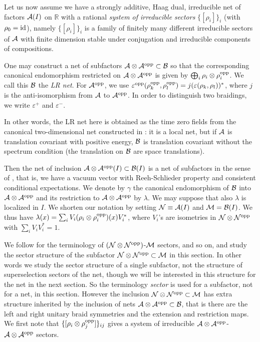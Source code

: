 \documentclass[12pt]{article}
\def\id{{\rm id}}
\def\o{{\rm opp}}
\def\e{\varepsilon}
\def\ga{\gamma}
\def\A{{\cal A}}
\def\B{{\cal B}}
\def\N{{\cal N}}
\def\M{{\cal M}}
\def\R{{\mathbb R}}
\def\AA{{\A\otimes \A^{\rm opp}}}
\begin{document}
Let us now assume we have
a  strongly additive, Haag dual,  irreducible
net of factors $\A(I)$ on $\R$ with  a rational {\it system of
irreducible sectors} $\{[\rho_i]\}_i$ (with $\rho_0=\id$),
namely $\{[\rho_i]\}_i$ is a family of finitely many
different irreducible sectors of $\A$ with finite dimension
stable under conjugation and irreducible components of compositions.

One may construct \cite{R2,LR} a net of subfactors $\AA\subset \B$ so 
that the corresponding canonical endomorphism restricted on $\AA$ is 
given by $\bigoplus_i \rho_i\otimes\rho_i^\o$.  We call this $\B$ the 
{\it LR net}.  For $\A^\o$, we use 
$\e^\o(\rho_k^\o,\rho_l^\o)=j(\e(\rho_k,\rho_l))^*$, where $j$ is the 
anti-isomorphism from $\A$ to $\A^\o$.  In order to distinguish two 
braidings, we write $\e^+$ and $\e^-$.

In other words, the LR net here is obtained as the time zero fields 
from the canonical two-dimensional net constructed in \cite{LR}: it is 
a local net, but if $\A$ is translation covariant with positive 
energy, $\B$ is translation covariant without the spectrum condition 
(the translation on $\B$ are space translations).

Then the net of inclusion $\AA(I)\subset \B(I)$ is a net of subfactors 
in the sense of \cite[Section 3]{LR}, that is, we have a vacuum vector 
with Reeh-Schlieder property and consistent conditional expectations.  
We denote by $\ga$ the canonical endomorphism of $\B$ into $\AA$ and 
its restriction to $\AA$ by $\lambda$.  We may suppose that also 
$\lambda$ is localized in $I$.  We shorten our notation by setting 
$\N\equiv\A(I)$ and $\M=\B(I)$.  We thus have $\lambda(x)=\sum_i 
V_i(\rho_i\otimes \rho^\o_i)(x)V_i^*$, where $V_i$'s are isometries in 
$\N\otimes\N^\o$ with $\sum_i V_i V_i^*=1$.

We follow \cite{I3} for the terminology of $(\N\otimes\N^\o)$-$\M$ 
sectors, and so on, and study the sector structure of the subfactor 
$\N\otimes\N^\o\subset \M$ in this section.  In other words we study 
the sector structure of a single subfactor, not the structure of 
superselection sectors of the net, though we will be interested in 
this structure for the net in the next section.  So the terminology 
{\it sector} is used for a subfactor, not for a net, in this section.  
However the inclusion $\N\otimes\N^\o\subset\M$ has extra structure 
inherited by the inclusion of nets $\AA\subset\B$, that is there are 
the left and right unitary braid symmetries and the extension and 
restriction maps.  We first note that 
$\{[\rho_i\otimes\rho_j^\o]\}_{ij}$ gives a system of irreducible 
$\AA$-$\AA$ sectors.
\end{document}
